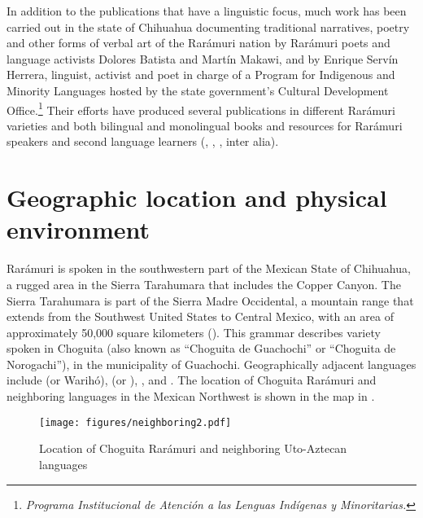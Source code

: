 In addition to the publications that have a linguistic focus, much work has been carried out in the state of Chihuahua documenting traditional narratives, poetry and other forms of verbal art of the Rarámuri nation by Rarámuri poets and language activists Dolores Batista and Martín Makawi, and by Enrique Servín Herrera, linguist, activist and poet in charge of a Program for Indigenous and Minority Languages hosted by the state government’s Cultural Development Office.\footnote{\textit{Programa Institucional de Atención a las Lenguas Indígenas y Minoritarias.}} Their efforts have produced several publications in different Rarámuri varieties and both bilingual and monolingual books and resources for Rarámuri speakers and second language learners (\citealt{batista1994amanece}, \citealt{servin2002ralamuli}, \citealt{makawi2012eka}, inter alia).

\section{Geographic location and physical environment}
\label{sec: geographic location and physical environment}


Rarámuri is spoken in the southwestern part of the Mexican State of Chihuahua, a rugged area in the Sierra Tarahumara that includes the Copper Canyon. The Sierra Tarahumara is part of the Sierra Madre Occidental, a mountain range that extends from the Southwest United States to Central Mexico, with an area of approximately 50,000 square kilometers (\citealt{cortina2012hijos}). This grammar describes variety spoken in Choguita (also known as ``Choguita de Guachochi'' or ``Choguita de Norogachi''), in the municipality of Guachochi. Geographically adjacent  languages include  (or Warihó),  (or ), ,  and . The location of Choguita Rarámuri and neighboring  languages in the Mexican Northwest is shown in the map in .

\begin{figure}[t]
\texttt{[image: figures/neighboring2.pdf]}
\caption{
\label{fig: CR and neighboring languages}
Location of Choguita Rarámuri and neighboring {Uto-Aztecan} languages}

\end{figure}


